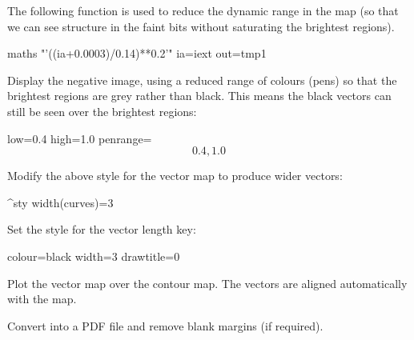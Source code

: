 The following function is used to reduce the dynamic range in the map (so
that we can see structure in the faint bits without saturating the
brightest regions).

\begin{terminalv}
maths "'((ia+0.0003)/0.14)**0.2'" ia=iext out=tmp1
\end{terminalv}


Display the negative image, using a reduced range of colours (pens) so
that the brightest regions are grey rather than black.  This means the
black vectors can still be seen over the brightest regions:

\begin{terminalv}
        low=0.4 high=1.0
        penrange=\[0.4,1.0\]
\end{terminalv}


Modify the above style for the vector map to produce wider vectors:

\begin{terminalv}
^sty
width(curves)=3
\end{terminalv}


Set the style for the vector length key:

\begin{terminalv}
colour=black
width=3
drawtitle=0
\end{terminalv}


Plot the vector map over the contour map. The vectors are aligned automatically with the map.

\begin{terminalv}
\end{terminalv}


Convert into a PDF file and remove blank margins (if required).

\begin{terminalv}
\end{terminalv}


